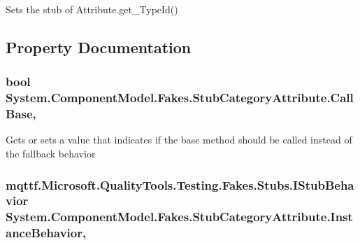 Sets the stub of Attribute.\-get\-\_\-\-Type\-Id()



\subsection{Property Documentation}
\hypertarget{class_system_1_1_component_model_1_1_fakes_1_1_stub_category_attribute_a29e7cbc4ee6ab96279e4bab37a9f1605}{
\subsubsection[{Call\-Base}]{\setlength{\rightskip}{0pt plus 5cm}bool System.\-Component\-Model.\-Fakes.\-Stub\-Category\-Attribute.\-Call\-Base\hspace{0.3cm}{\ttfamily [get]}, {\ttfamily [set]}}}\label{class_system_1_1_component_model_1_1_fakes_1_1_stub_category_attribute_a29e7cbc4ee6ab96279e4bab37a9f1605}


Gets or sets a value that indicates if the base method should be called instead of the fallback behavior

\hypertarget{class_system_1_1_component_model_1_1_fakes_1_1_stub_category_attribute_a7a02ea63ab6ccb46b5f5a3010fc17bf9}{
\subsubsection[{Instance\-Behavior}]{\setlength{\rightskip}{0pt plus 5cm}mqttf.\-Microsoft.\-Quality\-Tools.\-Testing.\-Fakes.\-Stubs.\-I\-Stub\-Behavior System.\-Component\-Model.\-Fakes.\-Stub\-Category\-Attribute.\-Instance\-Behavior\hspace{0.3cm}{\ttfamily [get]}, {\ttfamily [set]}}}\label{class_system_1_1_component_model_1_1_fakes_1_1_stub_category_attribute_a7a02ea63ab6ccb46b5f5a3010fc17bf9}


